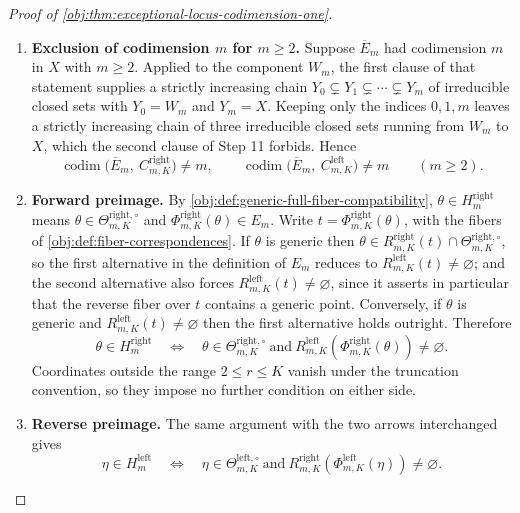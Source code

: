 \documentclass[11pt]{article}
\begin{document}
\begin{proof}[Proof of \cref{obj:thm:exceptional-locus-codimension-one}]
\begin{enumerate}
\item \textbf{Exclusion of codimension \(m\) for \(m\ge2\).}  Suppose \(\overline E_m\) had codimension \(m\) in \(X\) with \(m\ge2\).  Applied to the component \(W_m\), the first clause of that statement supplies a strictly increasing chain \(Y_0\subsetneq Y_1\subsetneq\cdots\subsetneq Y_m\) of irreducible closed sets with \(Y_0=W_m\) and \(Y_m=X\).  Keeping only the indices \(0,1,m\) leaves a strictly increasing chain of three irreducible closed sets running from \(W_m\) to \(X\), which the second clause of Step 11 forbids.  Hence
\[
\operatorname{codim}\bigl(\overline E_m,\ C^{\mathrm{right}}_{m,K}\bigr)\ne m,
\qquad
\operatorname{codim}\bigl(\overline E_m,\ C^{\mathrm{left}}_{m,K}\bigr)\ne m
\qquad (m\ge2).
\]

\item \textbf{Forward preimage.}  By \cref{obj:def:generic-full-fiber-compatibility}, \(\theta\in H^{\mathrm{right}}_m\) means \(\theta\in\Theta^{\mathrm{right},\circ}_{m,K}\) and \(\Phi^{\mathrm{right}}_{m,K}(\theta)\in E_m\).  Write \(t=\Phi^{\mathrm{right}}_{m,K}(\theta)\), with the fibers of \cref{obj:def:fiber-correspondences}.  If \(\theta\) is generic then \(\theta\in R^{\mathrm{right}}_{m,K}(t)\cap\Theta^{\mathrm{right},\circ}_{m,K}\), so the first alternative in the definition of \(E_m\) reduces to \(R^{\mathrm{left}}_{m,K}(t)\ne\varnothing\); and the second alternative also forces \(R^{\mathrm{left}}_{m,K}(t)\ne\varnothing\), since it asserts in particular that the reverse fiber over \(t\) contains a generic point.  Conversely, if \(\theta\) is generic and \(R^{\mathrm{left}}_{m,K}(t)\ne\varnothing\) then the first alternative holds outright.  Therefore
\[
\theta\in H^{\mathrm{right}}_m
\quad\Longleftrightarrow\quad
\theta\in\Theta^{\mathrm{right},\circ}_{m,K}
\ \text{and}\
R^{\mathrm{left}}_{m,K}\!\left(\Phi^{\mathrm{right}}_{m,K}(\theta)\right)\neq\varnothing .
\]
Coordinates outside the range \(2\le r\le K\) vanish under the truncation convention, so they impose no further condition on either side.

\item \textbf{Reverse preimage.}  The same argument with the two arrows interchanged gives
\[
\eta\in H^{\mathrm{left}}_m
\quad\Longleftrightarrow\quad
\eta\in\Theta^{\mathrm{left},\circ}_{m,K}
\ \text{and}\
R^{\mathrm{right}}_{m,K}\!\left(\Phi^{\mathrm{left}}_{m,K}(\eta)\right)\neq\varnothing .
\]


\end{enumerate}
\end{proof}
\end{document}
